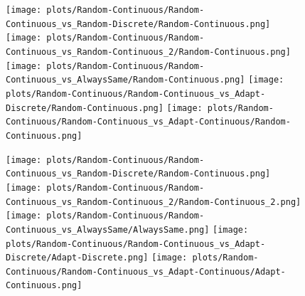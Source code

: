 \documentclass{article}
\begin{document}
\begin{figure}[!h]
	\centering
	\begin{minipage}[c]{0.1\textwidth}
		\raggedleft
	\end{minipage}
	\begin{minipage}[c]{0.80\textwidth}
		\hfill
		\hfill
		\hfill
		\hfill
		\hfill
	\end{minipage}
\end{figure}

\begin{figure}[!h]
	\centering
	\begin{minipage}[c]{0.1\textwidth}
		\raggedleft
	\end{minipage}
	\begin{minipage}[c]{0.80\textwidth}
		\texttt{[image: plots/Random-Continuous/Random-Continuous\_vs\_Random-Discrete/Random-Continuous.png]}\hfill
		\texttt{[image: plots/Random-Continuous/Random-Continuous\_vs\_Random-Continuous\_2/Random-Continuous.png]}\hfill
		\texttt{[image: plots/Random-Continuous/Random-Continuous\_vs\_AlwaysSame/Random-Continuous.png]}\hfill
		\texttt{[image: plots/Random-Continuous/Random-Continuous\_vs\_Adapt-Discrete/Random-Continuous.png]}\hfill
		\texttt{[image: plots/Random-Continuous/Random-Continuous\_vs\_Adapt-Continuous/Random-Continuous.png]}\hfill
	\end{minipage}
\end{figure}
\begin{figure}[!h]
	\centering
	\begin{minipage}[c]{0.1\textwidth}
		\raggedleft
	\end{minipage}
	\begin{minipage}[c]{0.80\textwidth}
		\texttt{[image: plots/Random-Continuous/Random-Continuous\_vs\_Random-Discrete/Random-Continuous.png]}\hfill
		\texttt{[image: plots/Random-Continuous/Random-Continuous\_vs\_Random-Continuous\_2/Random-Continuous\_2.png]}\hfill
		\texttt{[image: plots/Random-Continuous/Random-Continuous\_vs\_AlwaysSame/AlwaysSame.png]}\hfill
		\texttt{[image: plots/Random-Continuous/Random-Continuous\_vs\_Adapt-Discrete/Adapt-Discrete.png]}\hfill
		\texttt{[image: plots/Random-Continuous/Random-Continuous\_vs\_Adapt-Continuous/Adapt-Continuous.png]}\hfill
\end{minipage}
\end{figure}
\end{document}
